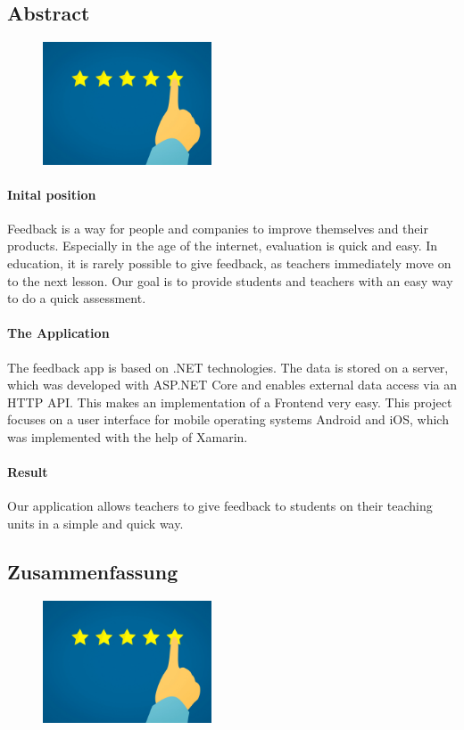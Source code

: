 \begin{spacing}{1}
    \chapter*{Abstract}
\end{spacing}
\begin{figure}[h]
  \includegraphics*[width=5cm]{./pics/feedback_stars.jpg}
\end{figure}

\subsubsection*{Inital position}
Feedback is a way for people and companies to improve themselves and their products. 
Especially in the age of the internet, evaluation is quick and easy. In education, it is rarely possible to give feedback, 
as teachers immediately move on to the next lesson.
Our goal is to provide students and teachers with an easy way to do a quick assessment.

\subsubsection{The Application}
The feedback app is based on .NET technologies. The data is stored on a server, 
which was developed with ASP.NET Core and enables external data access via an HTTP API. This makes an implementation of a Frontend very easy. 
This project focuses on a user interface for 
mobile operating systems Android and iOS, which was implemented with the help of Xamarin.

\subsubsection{Result}
Our application allows teachers to give feedback to students on their teaching units in a simple and quick way.

\newpage
\begin{spacing}{1}
    \chapter*{Zusammenfassung}
\end{spacing}
\begin{figure}[h]
  \includegraphics*[width=5cm]{./pics/feedback_stars.jpg}
\end{figure}

